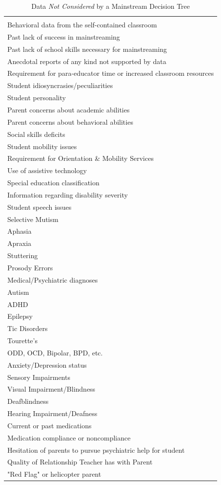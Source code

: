 \documentclass[twoside]{article}
\begin{document}
\begin{table}[tbp]
\centering
\caption{Data \textit{Not Considered} by a Mainstream Decision Tree}
\label{tab2}
\begin{tabular}{l}
\hline\\
Behavioral data from the self-contained classroom\\
Past lack of success in mainstreaming\\
Past lack of school skills necessary for mainstreaming\\
Anecdotal reports of any kind not supported by data\\
Requirement for para-educator time or increased classroom resources\\
Student idiosyncrasies/peculiarities\\
Student personality\\
Parent concerns about academic abilities\\
Parent concerns about behavioral abilities\\
Social skills deficits\\
Student mobility issues\\
\quad Requirement for Orientation \& Mobility Services \\
\quad Use of assistive technology \\
Special education classification\\
Information regarding disability severity\\
Student speech issues\\
\quad Selective Mutism \\
\quad Aphasia \\
\quad Apraxia \\
\quad Stuttering \\
\quad Prosody Errors \\
Medical/Psychiatric diagnoses\\
\quad Autism\\
\quad ADHD\\
\quad Epilepsy\\
\quad Tic Disorders\\
\quad Tourette's\\
\quad ODD, OCD, Bipolar, BPD, etc.\\
\quad Anxiety/Depression status \\
\quad Sensory Impairments \\
\qquad Visual Impairment/Blindness \\
\qquad Deafblindness \\
\qquad Hearing Impairment/Deafness \\
Current or past medications\\
Medication compliance or noncompliance\\
Hesitation of parents to pursue psychiatric help for student\\
Quality of Relationship Teacher has with Parent\\
"Red Flag" or helicopter parent \\
\hline
\end{tabular}
\end{table}
\end{document}

